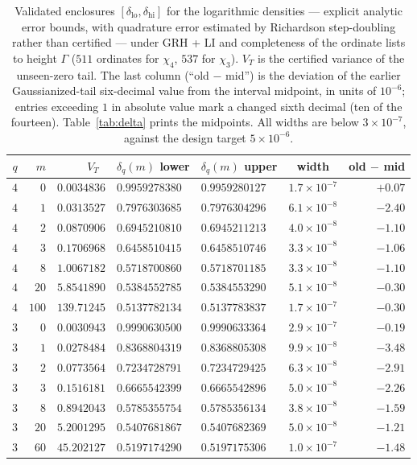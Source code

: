 \documentclass[11pt]{article}
\begin{document}
\begin{table}[h]\centering
\begin{tabular}{crrllcr}
\toprule
$q$ & $m$ & $V_T$\quad\ & $\delta_q(m)$ lower & $\delta_q(m)$ upper &
width & old $-$ mid \\
\midrule
$4$ & $0$   & $0.0034836$ & $0.9959278380$ & $0.9959280127$ & $1.7\times10^{-7}$ & $+0.07$ \\
$4$ & $1$   & $0.0313527$ & $0.7976303685$ & $0.7976304296$ & $6.1\times10^{-8}$ & $-2.40$ \\
$4$ & $2$   & $0.0870906$ & $0.6945210810$ & $0.6945211213$ & $4.0\times10^{-8}$ & $-1.10$ \\
$4$ & $3$   & $0.1706968$ & $0.6458510415$ & $0.6458510746$ & $3.3\times10^{-8}$ & $-1.06$ \\
$4$ & $8$   & $1.0067182$ & $0.5718700860$ & $0.5718701185$ & $3.3\times10^{-8}$ & $-1.10$ \\
$4$ & $20$  & $5.8541890$ & $0.5384552785$ & $0.5384553290$ & $5.1\times10^{-8}$ & $-0.30$ \\
$4$ & $100$ & $139.71245$ & $0.5137782134$ & $0.5137783837$ & $1.7\times10^{-7}$ & $-0.30$ \\
\midrule
$3$ & $0$   & $0.0030943$ & $0.9990630500$ & $0.9990633364$ & $2.9\times10^{-7}$ & $-0.19$ \\
$3$ & $1$   & $0.0278484$ & $0.8368804319$ & $0.8368805308$ & $9.9\times10^{-8}$ & $-3.48$ \\
$3$ & $2$   & $0.0773564$ & $0.7234728791$ & $0.7234729425$ & $6.3\times10^{-8}$ & $-2.91$ \\
$3$ & $3$   & $0.1516181$ & $0.6665542399$ & $0.6665542896$ & $5.0\times10^{-8}$ & $-2.26$ \\
$3$ & $8$   & $0.8942043$ & $0.5785355754$ & $0.5785356134$ & $3.8\times10^{-8}$ & $-1.59$ \\
$3$ & $20$  & $5.2001295$ & $0.5407681867$ & $0.5407682369$ & $5.0\times10^{-8}$ & $-1.21$ \\
$3$ & $60$  & $45.202127$ & $0.5197174290$ & $0.5197175306$ & $1.0\times10^{-7}$ & $-1.48$ \\
\bottomrule
\end{tabular}
\caption{Validated enclosures $[\delta_{\mathrm{lo}},
\delta_{\mathrm{hi}}]$ for the logarithmic densities --- explicit
analytic error bounds, with quadrature error estimated by Richardson
step-doubling rather than certified --- under
GRH + LI and completeness of the ordinate lists to height $\Gamma$
($511$ ordinates for $\chi_4$, $537$ for $\chi_3$). $V_T$ is the
certified variance of the unseen-zero tail. The last column
(``old $-$ mid'') is the deviation of the earlier Gaussianized-tail
six-decimal value from the interval
midpoint, in units of $10^{-6}$; entries exceeding $1$ in absolute
value mark a changed sixth decimal (ten of the fourteen).
Table~\ref{tab:delta} prints the midpoints.
All widths are below $3\times10^{-7}$, against the design target
$5\times10^{-6}$.}
\label{tab:enclose}
\end{table}
\end{document}
